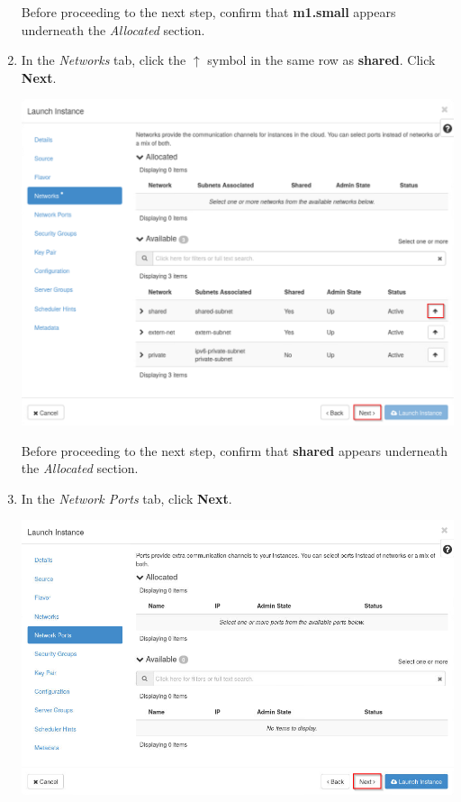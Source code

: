 \documentclass[letterpaper, 12pt]{article}
\begin{document}
\begin{enumerate}
    \begin{stopbox}
        Before proceeding to the next step, confirm that \textbf{m1.small} appears underneath the \textit{Allocated} section.
    \end{stopbox}

    \item In the \textit{Networks} tab, click the $\uparrow$ symbol in the same row as \textbf{shared}.
    Click \textbf{Next}.

    \begin{center}
        \includegraphics[width=\linewidth]{images/part2/step6.png}
    \end{center}

    \begin{stopbox}
        Before proceeding to the next step, confirm that \textbf{shared} appears underneath the \textit{Allocated} section.
    \end{stopbox}

    \item In the \textit{Network Ports} tab, click \textbf{Next}.

    \begin{center}
        \includegraphics[width=\linewidth]{images/part2/step7.png}
    \end{center}


\end{enumerate}
\end{document}
